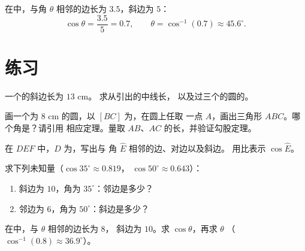 \begin{example}[求角]\label{ex:g8:cosine:angle}
在中，与角 $\theta$ 相邻的边长为
$3.5$，斜边为 $5$：
\[
\cos\theta = \frac{3.5}{5} = 0.7,
\qquad
\theta = \cos^{-1}(0.7) \approx 45.6^\circ .
\]
\end{example}

\section{练习}

\begin{exercise}[$\star$]\label{exo:g8:cosine:1}
一个的斜边长为 $13$ cm。
求从引出的中线长，
以及过三个的圆的。
\end{exercise}

\begin{exercise}[$\star$]\label{exo:g8:cosine:2}
画一个为 $8$ cm 的圆，以 $[BC]$ 为，在圆上任取
一点 $A$，画出三角形 $ABC$。哪个角是？请引用
相应定理。量取 $AB$、$AC$ 的长，并验证勾股定理。
\end{exercise}

\begin{exercise}[$\star$]\label{exo:g8:cosine:3}
在 $DEF$ 中，$D$ 为，写出与
角 $\widehat E$ 相邻的边、对边以及斜边。
用比表示 $\cos \widehat E$。
\end{exercise}

\begin{exercise}[$\star$]\label{exo:g8:cosine:4}
求下列未知量（$\cos 35^\circ \approx 0.819$，
$\cos 50^\circ \approx 0.643$）：
\begin{enumerate}
  \item 斜边为 $10$，角为 $35^\circ$：邻边是多少？
  \item 邻边为 $6$，角为 $50^\circ$：斜边是多少？
\end{enumerate}
\end{exercise}

\begin{exercise}[$\star$]\label{exo:g8:cosine:5}
在中，与 $\theta$ 相邻的边长为 $8$，
斜边为 $10$。求 $\cos\theta$，再求 $\theta$
（$\cos^{-1}(0.8) \approx 36.9^\circ$）。
\end{exercise}

